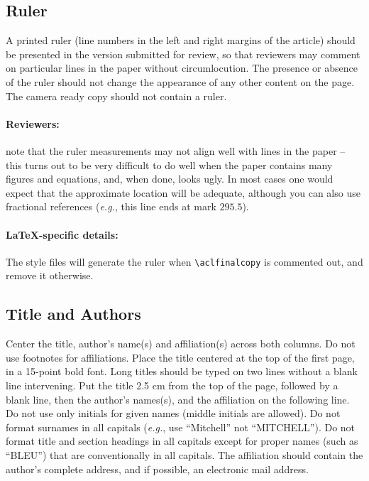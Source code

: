 \documentclass[11pt,a4paper]{article}
\begin{document}
	
	\subsection{Ruler}
	A printed ruler (line numbers in the left and right margins of the article) should be presented in the version submitted for review, so that reviewers may comment on particular lines in the paper without circumlocution.
	The presence or absence of the ruler should not change the appearance of any other content on the page.
	The camera ready copy should not contain a ruler.
	
	\paragraph{Reviewers:}
	note that the ruler measurements may not align well with lines in the paper -- this turns out to be very difficult to do well when the paper contains many figures and equations, and, when done, looks ugly.
	In most cases one would expect that the approximate location will be adequate, although you can also use fractional references (\emph{e.g.}, this line ends at mark $295.5$).
	
	\paragraph{\LaTeX-specific details:}
	The style files will generate the ruler when {\small\verb|\aclfinalcopy|} is commented out, and remove it otherwise.
	
	\subsection{Title and Authors}
	\label{ssec:title-authors}
	
	Center the title, author's name(s) and affiliation(s) across both columns.
	Do not use footnotes for affiliations.
	Place the title centered at the top of the first page, in a 15-point bold font.
	Long titles should be typed on two lines without a blank line intervening.
	Put the title 2.5 cm from the top of the page, followed by a blank line, then the author's names(s), and the affiliation on the following line.
	Do not use only initials for given names (middle initials are allowed).
	Do not format surnames in all capitals (\emph{e.g.}, use ``Mitchell'' not ``MITCHELL'').
	Do not format title and section headings in all capitals except for proper names (such as ``BLEU'') that are
	conventionally in all capitals.
	The affiliation should contain the author's complete address, and if possible, an electronic mail address.
	
\end{document}
